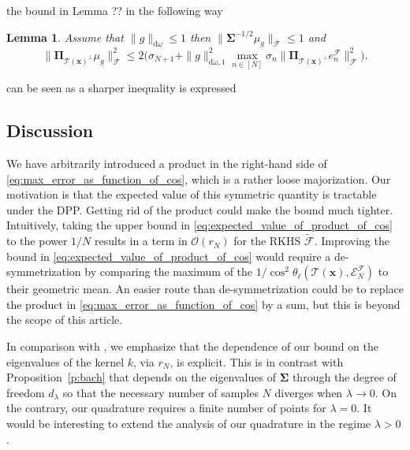 \documentclass[twoside,11pt]{book}
\newtheorem{lemma}{Lemma}
\begin{document}
the bound in Lemma ?? in the following way



\begin{lemma}\label{lemma:strong_approximation_error_spectral_bound}
Assume that $\|g\|_{\mathrm{d}\omega} \leq 1$ then $\| \bm{\Sigma}^{-1/2} \mu_{g} \|_{\mathcal{F}} \leq 1$ and
\begin{equation}
	\|\bm{\Pi}_{\mathcal{T}(\bm{x})^{\perp}}\mu_{g}\|^{2}_{\mathcal{F}} \leq 2 \bigg( \sigma_{N+1} + \|g\|_{\mathrm{d}\omega,1}^2  \max\limits_{ n \in [N]} \sigma_{n}\|\bm{\Pi}_{\mathcal{T}(\bm{x})^{\perp}} e_{n}^{\mathcal{F}}\|_{\mathcal{F}}^{2} \bigg) .
\label{e:boundingOrthogonalProjection}
\end{equation}
\end{lemma}



can be seen as a sharper inequality is expressed 


\label{subsec:dpp_quadrature_error_strong}

\subsection{Discussion}
\label{s:discussion}
We have arbitrarily introduced a product in the right-hand side of \eqref{eq:max_error_as_function_of_cos}, which is a rather loose majorization. Our motivation is that the expected value of this symmetric quantity is tractable under the DPP. Getting rid of the product could make the bound much tighter. Intuitively, taking the upper bound in \eqref{eq:expected_value_of_product_of_cos} to the power $1/N$ results in a term in $\mathcal{O}(r_{N})$ for the RKHS $\tilde{\mathcal{F}}$. Improving the bound in \eqref{eq:expected_value_of_product_of_cos} would require a de-symmetrization by comparing the maximum of the $1/\cos^{2} \theta_{\ell}(\mathcal{T}(\bm{x}),\mathcal{E}^{\mathcal{F}}_{N})$ to their geometric mean.
An easier route than de-symmetrization could be to replace the product in \eqref{eq:max_error_as_function_of_cos} by a sum, but this is beyond the scope of this article.

In comparison with \cite{Bac17}, we emphasize that the dependence of our bound on the eigenvalues of the kernel $k$, via $r_{N}$, is explicit. This is in contrast with Proposition~\ref{p:bach} that depends on the eigenvalues of $\bm{\Sigma}$ through the degree of freedom $d_{\lambda}$ so that the necessary number of samples $N$ diverges when $\lambda \rightarrow 0$. On the contrary, our quadrature requires a finite number of points for $\lambda =0$. It would be interesting to extend the analysis of our quadrature in the regime $\lambda >0$.
\end{document}
